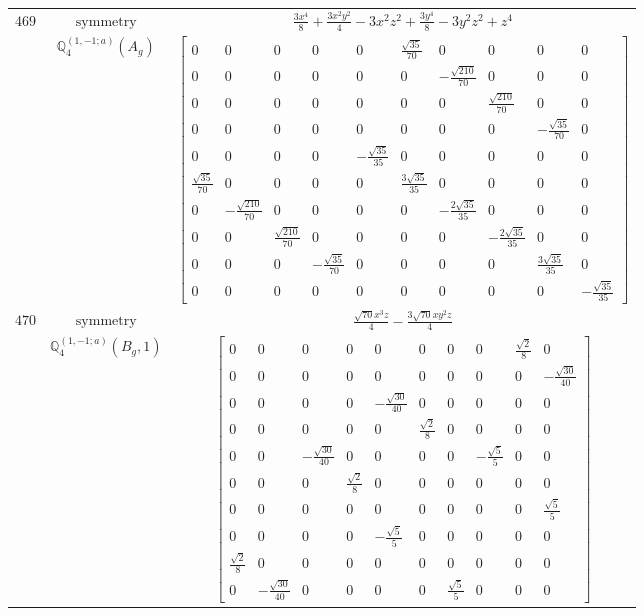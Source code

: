 \documentclass[fleqn,8pt,landscape]{jsarticle}
\begin{document}
\begin{longtable}{ccc}
$ 469 $ & $ \text{symmetry} $ & $ \frac{3 x^{4}}{8} + \frac{3 x^{2} y^{2}}{4} - 3 x^{2} z^{2} + \frac{3 y^{4}}{8} - 3 y^{2} z^{2} + z^{4} $ \\
$  $ & $ \mathbb{Q}_{4}^{(1,-1;a)}(A_{g}) $ & $ \begin{bmatrix} 0 & 0 & 0 & 0 & 0 & \frac{\sqrt{35}}{70} & 0 & 0 & 0 & 0 \\ 0 & 0 & 0 & 0 & 0 & 0 & - \frac{\sqrt{210}}{70} & 0 & 0 & 0 \\ 0 & 0 & 0 & 0 & 0 & 0 & 0 & \frac{\sqrt{210}}{70} & 0 & 0 \\ 0 & 0 & 0 & 0 & 0 & 0 & 0 & 0 & - \frac{\sqrt{35}}{70} & 0 \\ 0 & 0 & 0 & 0 & - \frac{\sqrt{35}}{35} & 0 & 0 & 0 & 0 & 0 \\ \frac{\sqrt{35}}{70} & 0 & 0 & 0 & 0 & \frac{3 \sqrt{35}}{35} & 0 & 0 & 0 & 0 \\ 0 & - \frac{\sqrt{210}}{70} & 0 & 0 & 0 & 0 & - \frac{2 \sqrt{35}}{35} & 0 & 0 & 0 \\ 0 & 0 & \frac{\sqrt{210}}{70} & 0 & 0 & 0 & 0 & - \frac{2 \sqrt{35}}{35} & 0 & 0 \\ 0 & 0 & 0 & - \frac{\sqrt{35}}{70} & 0 & 0 & 0 & 0 & \frac{3 \sqrt{35}}{35} & 0 \\ 0 & 0 & 0 & 0 & 0 & 0 & 0 & 0 & 0 & - \frac{\sqrt{35}}{35} \end{bmatrix} $ \\ \hline
$ 470 $ & $ \text{symmetry} $ & $ \frac{\sqrt{70} x^{3} z}{4} - \frac{3 \sqrt{70} x y^{2} z}{4} $ \\
$  $ & $ \mathbb{Q}_{4}^{(1,-1;a)}(B_{g},1) $ & $ \begin{bmatrix} 0 & 0 & 0 & 0 & 0 & 0 & 0 & 0 & \frac{\sqrt{2}}{8} & 0 \\ 0 & 0 & 0 & 0 & 0 & 0 & 0 & 0 & 0 & - \frac{\sqrt{30}}{40} \\ 0 & 0 & 0 & 0 & - \frac{\sqrt{30}}{40} & 0 & 0 & 0 & 0 & 0 \\ 0 & 0 & 0 & 0 & 0 & \frac{\sqrt{2}}{8} & 0 & 0 & 0 & 0 \\ 0 & 0 & - \frac{\sqrt{30}}{40} & 0 & 0 & 0 & 0 & - \frac{\sqrt{5}}{5} & 0 & 0 \\ 0 & 0 & 0 & \frac{\sqrt{2}}{8} & 0 & 0 & 0 & 0 & 0 & 0 \\ 0 & 0 & 0 & 0 & 0 & 0 & 0 & 0 & 0 & \frac{\sqrt{5}}{5} \\ 0 & 0 & 0 & 0 & - \frac{\sqrt{5}}{5} & 0 & 0 & 0 & 0 & 0 \\ \frac{\sqrt{2}}{8} & 0 & 0 & 0 & 0 & 0 & 0 & 0 & 0 & 0 \\ 0 & - \frac{\sqrt{30}}{40} & 0 & 0 & 0 & 0 & \frac{\sqrt{5}}{5} & 0 & 0 & 0 \end{bmatrix} $ \\ \hline

\end{longtable}
\end{document}
